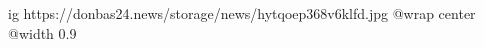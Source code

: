  
 
 
 
 

\ifcmt
  ig https://donbas24.news/storage/news/hytqoep368v6klfd.jpg
  @wrap center
  @width 0.9
\fi
